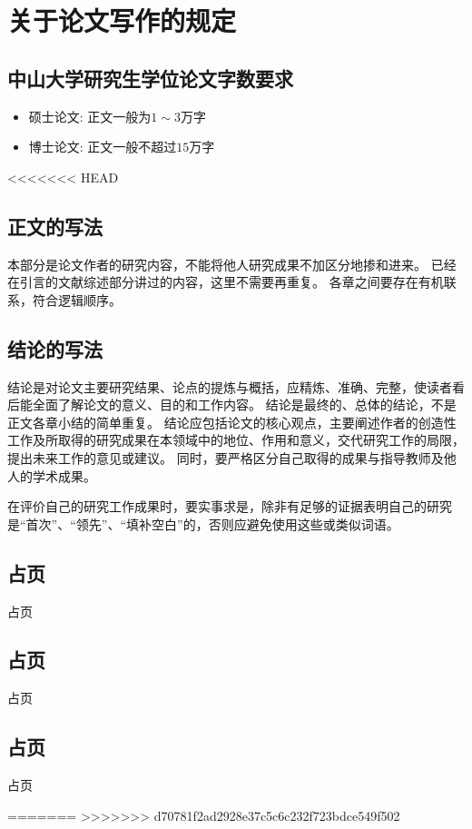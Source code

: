
\chapter{关于论文写作的规定}

\section{中山大学研究生学位论文字数要求}
\begin{itemize}
    \item 硕士论文: 正文一般为$1 \sim 3$万字
    \item 博士论文: 正文一般不超过$15$万字
\end{itemize}



<<<<<<< HEAD
\section{正文的写法}

本部分是论文作者的研究内容，不能将他人研究成果不加区分地掺和进来。
已经在引言的文献综述部分讲过的内容，这里不需要再重复。
各章之间要存在有机联系，符合逻辑顺序。



\section{结论的写法}

结论是对论文主要研究结果、论点的提炼与概括，应精炼、准确、完整，使读者看后能全面了解论文的意义、目的和工作内容。
结论是最终的、总体的结论，不是正文各章小结的简单重复。
结论应包括论文的核心观点，主要阐述作者的创造性工作及所取得的研究成果在本领域中的地位、作用和意义，交代研究工作的局限，提出未来工作的意见或建议。
同时，要严格区分自己取得的成果与指导教师及他人的学术成果。

在评价自己的研究工作成果时，要实事求是，除非有足够的证据表明自己的研究是“首次”、“领先”、“填补空白”的，否则应避免使用这些或类似词语。
\section{占页}
占页
\section{占页}
占页
\section{占页}
占页

\cleardoublepage
=======
>>>>>>> d70781f2ad2928e37c5c6c232f723bdce549f502
